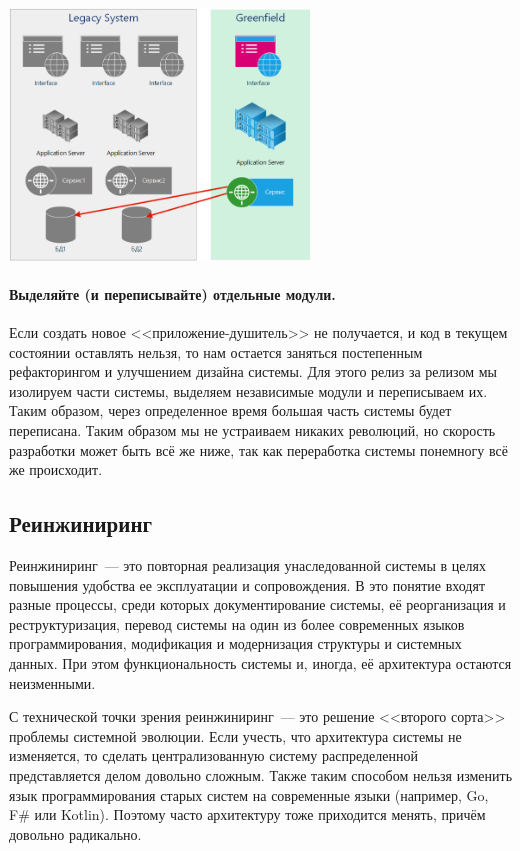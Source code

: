 \documentclass{../../text-style}
\begin{document}
\begin{center}
    \includegraphics[width=0.6\textwidth]{stranglerApp.png}
\end{center}

\paragraph{Выделяйте (и переписывайте) отдельные модули.} Если создать новое <<приложение-душитель>> не получается, и код в текущем состоянии оставлять нельзя, то нам остается заняться постепенным рефакторингом и улучшением дизайна системы. Для этого релиз за релизом мы изолируем части системы, выделяем независимые модули и переписываем их. Таким образом, через определенное время большая часть системы будет переписана. Таким образом мы не устраиваем никаких революций, но скорость разработки может быть всё же ниже, так как переработка системы понемногу всё же происходит.

\subsection{Реинжиниринг}

Реинжиниринг~--- это повторная реализация унаследованной системы в целях повышения удобства ее эксплуатации и сопровождения. В это понятие входят разные процессы, среди которых документирование системы, её реорганизация и реструктуризация, перевод системы на один из более современных языков программирования, модификация и модернизация структуры и системных данных. При этом функциональность системы и, иногда, её архитектура остаются неизменными.

С технической точки зрения реинжиниринг~--- это решение <<второго сорта>> проблемы системной эволюции. Если учесть, что архитектура системы не изменяется, то сделать централизованную систему распределенной представляется делом довольно сложным. Также таким способом нельзя изменить язык программирования старых систем на современные языки (например, Go, F\# или Kotlin). Поэтому часто архитектуру тоже приходится менять, причём довольно радикально.
\end{document}

